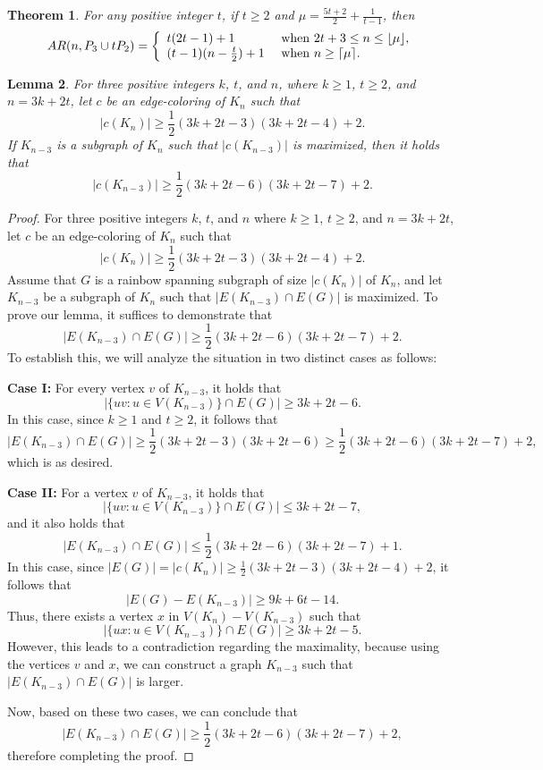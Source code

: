 \documentclass[12pt]{article}
\newtheorem{theorem}{Theorem}[section]
\newtheorem{lemma}[theorem]{Lemma}
\begin{document}
\begin{theorem}{\rm \cite{p1-8}}\label{rth1}
For any positive integer $t$, if $t\geq2$ and $\mu=\frac{5t+2}{2}+\frac{1}{t-1}$, then
\[AR(n, P_3 \cup tP_2) =\left\{\begin{array}{ll}
  t(2t-1)+1&{\rm ~when~} 2t+3 \leq n\leq\lfloor\mu\rfloor,  \\
 (t-1)(n-\frac{t}{2})+1&  {\rm ~when~ } n\geq\lceil\mu\rceil.
 \end{array}\right.\]
\end{theorem}

\begin{lemma}\label{lm1}
For three positive integers \( k \), \( t \), and \( n \), where $k\geq1$, \(t \geq 2\), and \(n = 3k + 2t\), let \( c \) be an edge-coloring of \( K_n \) such that 
\[
|c(K_n)| \geq \frac{1}{2} (3k + 2t - 3)(3k + 2t - 4) + 2.
\]
If \( K_{n-3} \) is a subgraph of \( K_n \) such that 
$|c(K_{n-3})|$ is maximized, then it holds that
\[
|c(K_{n-3})| \geq \frac{1}{2}(3k + 2t - 6)(3k + 2t - 7) + 2.
\]
\end{lemma}
\begin{proof}
  For three positive integers \(k\), \(t\), and \(n\) where $k\geq1$, \(t \geq 2\), and \(n = 3k + 2t\), let \(c\) be an edge-coloring of \(K_n\) such that 
\[
|c(K_n)| \geq \frac{1}{2}(3k + 2t - 3)(3k + 2t - 4) + 2.
\]
Assume that \(G\) is a rainbow spanning subgraph of size \(|c(K_n)|\) of \(K_n\), and let \(K_{n-3}\) be a subgraph of \(K_n\) such that \(|E(K_{n-3}) \cap E(G)|\) is maximized. To prove our lemma, it suffices to demonstrate that 
\[
|E(K_{n-3}) \cap E(G)| \geq \frac{1}{2}(3k + 2t - 6)(3k + 2t - 7) + 2.
\]
To establish this,  we will analyze the situation in two distinct cases as follows:

\noindent
{\bf Case I:} For every vertex \(v\) of \(K_{n-3}\), it holds that
   \[
   |\{uv : u \in V(K_{n-3})\} \cap E(G)| \geq 3k + 2t - 6.
   \]
   In this case, since $k\geq1$ and \(t \geq 2\), it follows that 
   \[
   |E(K_{n-3}) \cap E(G)| \geq \frac{1}{2}(3k + 2t - 3)(3k + 2t - 6) \geq \frac{1}{2}(3k + 2t - 6)(3k + 2t - 7) + 2,
   \]
   which is as desired.
   
   \noindent
 {\bf Case II:} For a vertex \(v\) of \(K_{n-3}\), it holds that
   \[
   |\{uv : u \in V(K_{n-3})\} \cap E(G)| \leq 3k + 2t - 7,
   \]
   and it also holds that 
   \[
   |E(K_{n-3}) \cap E(G)| \leq \frac{1}{2}(3k + 2t - 6)(3k + 2t - 7) + 1.
   \]
   In this case, since \(|E(G)| = |c(K_n)| \geq \frac{1}{2}(3k + 2t - 3)(3k + 2t - 4) + 2\), it follows that 
   \[
   |E(G) - E(K_{n-3})| \geq 9k + 6t - 14.
   \]
   Thus, there exists a vertex \(x\) in \(V(K_n) - V(K_{n-3})\) such that 
   \[
   |\{ux : u \in V(K_{n-3})\} \cap E(G)| \geq 3k + 2t - 5.
   \]
   However, this leads to a contradiction regarding the maximality, because using the vertices \(v\) and \(x\), we can construct a graph \(K_{n-3}\) such that 
   \(|E(K_{n-3}) \cap E(G)|\) is larger.
   
Now, based on these two cases, we can conclude that 
\[
|E(K_{n-3}) \cap E(G)| \geq \frac{1}{2}(3k + 2t - 6)(3k + 2t - 7) + 2,
\]
therefore completing the proof.
\end{proof}
\end{document}
